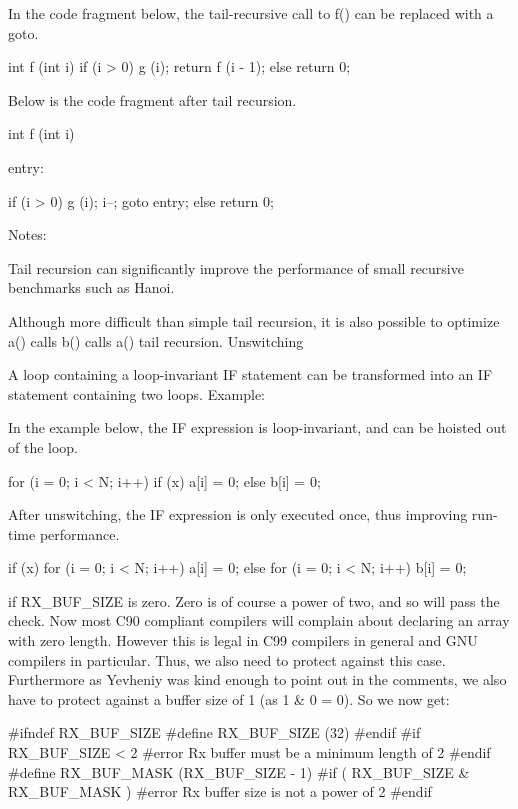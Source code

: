{{{{{{{{{{In the code fragment below, the tail-recursive call to f() can be replaced with a goto.

    int f (int i)
    {
      if (i > 0)
        {
          g (i);
          return f (i - 1);
        }
      else
        return 0;
    }

Below is the code fragment after tail recursion.

    int f (int i)
    {

     entry:

      if (i > 0)
        {
          g (i);
          i--;
          goto entry;
        }
      else
        return 0;
    }

Notes:

Tail recursion can significantly improve the performance of small recursive benchmarks such as Hanoi.

Although more difficult than simple tail recursion, it is also possible to optimize a() calls b() calls a() tail recursion. 
Unswitching

A loop containing a loop-invariant IF statement can be transformed into an IF statement containing two loops.
Example:

In the example below, the IF expression is loop-invariant, and can be hoisted out of the loop.

    for (i = 0; i < N; i++)
      if (x)
        a[i] = 0;
      else
        b[i] = 0;

After unswitching, the IF expression is only executed once, thus improving run-time performance.

    if (x)
      for (i = 0; i < N; i++)
        a[i] = 0;
    else
      for (i = 0; i < N; i++)
        b[i] = 0;



 if RX_BUF_SIZE is zero. Zero is of course a power of two, and so will pass the check. Now most C90 compliant compilers will complain about declaring an array with zero length. However this is legal in C99 compilers in general and GNU compilers in particular. Thus, we also need to protect against this case. Furthermore as Yevheniy was kind enough to point out in the comments, we also have to protect against a buffer size of 1 (as 1 & 0 = 0). So we now get:

#ifndef RX_BUF_SIZE
 #define RX_BUF_SIZE (32)
#endif
#if RX_BUF_SIZE < 2
 #error Rx buffer must be a minimum length of 2
#endif
#define RX_BUF_MASK  (RX_BUF_SIZE - 1)
#if ( RX_BUF_SIZE & RX_BUF_MASK )
 #error Rx buffer size is not a power of 2
#endif

}}}}}}}}}}
